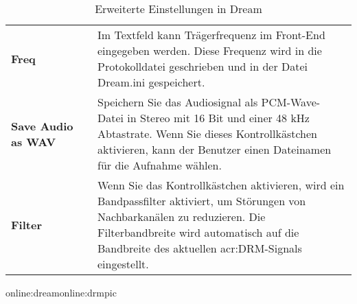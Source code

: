 \begin{table}[htb]
\begin{center}
\begin{tabular}{p{0.25\linewidth} p{0.75\linewidth}}
			\textbf{Freq} & Im Textfeld kann Trägerfrequenz im Front-End eingegeben werden. Diese Frequenz wird in die Protokolldatei geschrieben und in der Datei Dream.ini gespeichert.
			\\
			
			\textbf{Save Audio as WAV} & Speichern Sie das Audiosignal als PCM-Wave-Datei in Stereo mit 16 Bit und einer 48 kHz Abtastrate. Wenn Sie dieses Kontrollkästchen aktivieren, kann der Benutzer einen Dateinamen für die Aufnahme wählen. \\
			
			\textbf{Filter}& Wenn Sie das Kontrollkästchen aktivieren, wird ein Bandpassfilter aktiviert, um Störungen von Nachbarkanälen zu reduzieren. Die Filterbandbreite wird automatisch auf die Bandbreite des aktuellen \gls{acr:DRM}-Signals eingestellt.\\
			\bottomrule
		\end{tabular}
		\caption{Erweiterte Einstellungen in Dream}\gls{online:dream}\gls{online:drmpic}
		\label{tab:advdream}
	\end{center}
\end{table}

